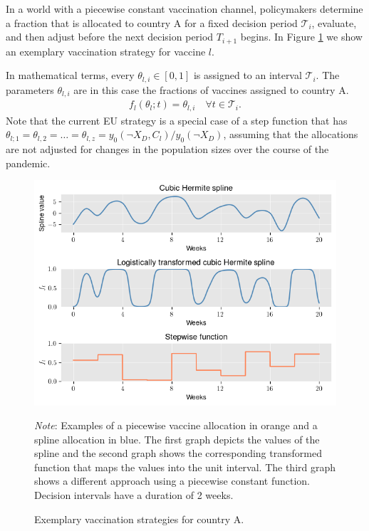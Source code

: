 In a world with a piecewise constant vaccination channel, policymakers determine a fraction that is allocated to country A for a fixed decision period $\mathcal{T}_i$, evaluate, and then adjust before the next decision period $T_{i+1}$ begins. In Figure \ref{fig:examples} we show an exemplary vaccination strategy for vaccine $l$.

In mathematical terms, every $\theta_{l,i} \in [0,1]$ is assigned to an interval $\mathcal{T}_i$. The parameters $\theta_{l,i}$ are in this case the fractions of vaccines assigned to country A.
\begin{align}
f_l(\theta_l; t) = \theta_{l,i} \quad \forall t \in \mathcal{T}_i.
\end{align}
Note that the current EU strategy is a special case of a step function that has $\theta_{l;1}= \theta_{l,2} = \hdots = \theta_{l,z}=y_0(\neg X_D, C_l)/y_0(\neg X_D)$, assuming that the allocations are not adjusted for changes in the population sizes over the course of the pandemic.
\begin{figure}[h!]
\centering
\includegraphics[scale=0.8]{images/example_methods.png}\\
\begin{flushleft}
\scriptsize{\textit{Note}: Examples of a piecewise vaccine allocation in orange and a spline allocation in blue. The first graph depicts the values of the spline and the second graph shows the corresponding transformed function that maps the values into the unit interval. The third graph shows a different approach using a piecewise constant function. Decision intervals have a duration of 2 weeks.}
\end{flushleft}
\caption{Exemplary vaccination strategies for country A.}
\label{fig:examples}
\end{figure}

